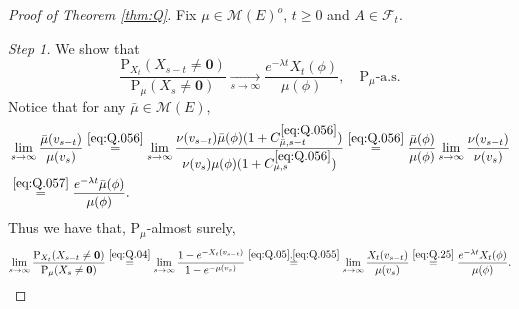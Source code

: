 \documentclass[12pt,a4paper]{amsart}
\numberwithin{equation}{section}
\theoremstyle{plain}
\theoremstyle{definition}
\theoremstyle{remark}
\begin{document}
\begin{proof}[Proof of Theorem \ref{thm:Q}]
	Fix  $\mu\in \mathcal M(E)^o$, $t\ge 0$ and $A\in\mathscr F_t$.
	
\emph{Step 1.} We show that
	\begin{equation} \label{eq:Q.1}
		\frac{\mathrm P_{X_t}(X_{s-t} \neq \mathbf 0)}{\mathrm P_\mu(X_{s} \neq \mathbf 0)}
		\xrightarrow[s\to \infty]{} \frac{e^{-\lambda t}X_t(\phi)}{\mu(\phi) },
		\quad \mathrm P_\mu\text{-a.s.}
\end{equation}
	Notice that for any $\bar \mu\in \mathcal M(E)$,
	\begin{align}
		&\lim_{s\rightarrow\infty}\dfrac{ \bar \mu(v_{s-t}) }{ \mu(v_s) }
		\overset{\eqref{eq:Q.056}}=\lim_{s\to \infty} \frac{\nu(v_{s-t})\bar \mu (\phi) (1+C_{\bar \mu,s-t}^{\eqref{eq:Q.056}})}{\nu(v_s)\mu(\phi)(1+C_{\mu,s}^{\eqref{eq:Q.056}})}
		\overset{\eqref{eq:Q.056}}= \frac{\bar \mu(\phi)}{\mu(\phi)}\lim_{s\to \infty} \frac{\nu(v_{s-t}) }{\nu(v_s)}
		\\\label{eq:Q.25}&\overset{\eqref{eq:Q.057}}= \frac{e^{-\lambda t} \bar \mu(\phi)}{\mu(\phi)}.
	\end{align}
	Thus we have that, $\mathrm P_\mu$-almost surely,
	\begin{equation}
		\lim_{s\to\infty}\frac{\mathrm P_{X_t}(X_{s-t}\neq \mathbf 0)}{\mathrm P_\mu(X_s\neq \mathbf 0)}
		\overset{\eqref{eq:Q.04}}=\lim_{s\to\infty}\frac{1-e^{- X_t(v_{s-t}) }}{1-e^{- \mu(v_s) }}
		\overset{\eqref{eq:Q.05},\eqref{eq:Q.055}}=\lim_{s\rightarrow\infty}\dfrac{ X_t(v_{s-t}) }{ \mu(v_s) }
		\overset{\eqref{eq:Q.25}}= \frac{e^{-\lambda t} X_t(\phi)}{\mu(\phi)}.
	\end{equation}


\end{proof}
\end{document}
